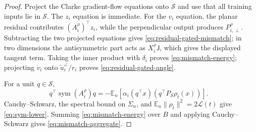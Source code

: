 \documentclass{article} %
\theoremstyle{plain}
\theoremstyle{definition}
\theoremstyle{remark}
\begin{document}
\begin{proof}
Project the Clarke gradient-flow equations onto $\mathcal S$ and use that
all training inputs lie in $\mathcal S$.  The $z_i$ equation is immediate.
For the $v_i$ equation, the planar residual contributes
$(A_i^\rho)^\top z_i$, while the perpendicular output produces
$P_{i,\perp}^\rho$.  Subtracting the two projected equations gives
\eqref{eq:residual-gated-mismatch}; in two dimensions the antisymmetric part
acts as
$X_i^\rho\mathsf J$, which gives the displayed tangent term.  Taking the
inner product with $\delta_i$ proves \eqref{eq:mismatch-energy}; projecting
$\dot v_i$ onto $\widetilde u_i^\angle/r_i$ proves
\eqref{eq:residual-gated-angle}.

For a unit $q\in\mathcal S$,
\[
q^\top\operatorname{sym}(A_i^\rho)q
=
-\mathbb E_n
\left[
\alpha_i(q^\top x)(q^\top P_{\mathcal S}\rho_t(x))
\right].
\]
Cauchy--Schwarz, the spectral bound on $\Sigma_n$, and
$\mathbb E_n\|\rho_t\|^2=2\mathcal L(t)$ give
\eqref{eq:sym-lower}.  Summing \eqref{eq:mismatch-energy} over $B$ and applying
Cauchy--Schwarz gives \eqref{eq:mismatch-aggregate}.
\end{proof}

\end{document}
